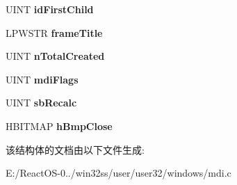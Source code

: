 \begin{DoxyCompactItemize}
U\+I\+NT {\bfseries id\+First\+Child}
\item 
\mbox{\label{struct_m_d_i_c_l_i_e_n_t_i_n_f_o_a4d2fb1308fe5abfd574c58aa53bfd9f5}} 
L\+P\+W\+S\+TR {\bfseries frame\+Title}
\item 
\mbox{\label{struct_m_d_i_c_l_i_e_n_t_i_n_f_o_a6486198a44c00c78b0e4525315492756}} 
U\+I\+NT {\bfseries n\+Total\+Created}
\item 
\mbox{\label{struct_m_d_i_c_l_i_e_n_t_i_n_f_o_a9f82d08f3d63086ea06c36f69bad574f}} 
U\+I\+NT {\bfseries mdi\+Flags}
\item 
\mbox{\label{struct_m_d_i_c_l_i_e_n_t_i_n_f_o_ae1a92dbd6c8c01d9b8d3039b4bc9ee5e}} 
U\+I\+NT {\bfseries sb\+Recalc}
\item 
\mbox{\label{struct_m_d_i_c_l_i_e_n_t_i_n_f_o_a6e9075a2066f56f2674fd8d49fa5cac3}} 
H\+B\+I\+T\+M\+AP {\bfseries h\+Bmp\+Close}
\end{DoxyCompactItemize}


该结构体的文档由以下文件生成\+:\begin{DoxyCompactItemize}
\item 
E\+:/\+React\+O\+S-\/0../win32ss/user/user32/windows/mdi.\+c\end{DoxyCompactItemize}
